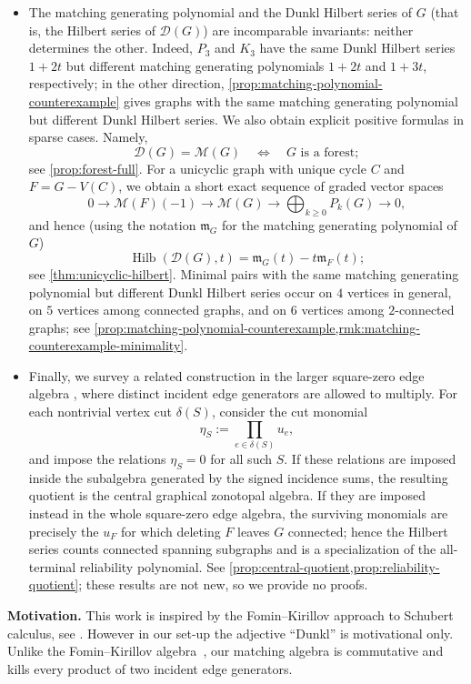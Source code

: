 \documentclass[12pt]{amsart}
\theoremstyle{definition}
\theoremstyle{remark}
\newcommand{\Hilb}{\operatorname{Hilb}}
\begin{document}
\begin{itemize}
\item
The matching generating polynomial and the Dunkl Hilbert series of $G$
(that is, the Hilbert series of $\mathcal D(G)$) are
incomparable invariants: neither determines the other.  Indeed, $P_3$ and
$K_3$ have the same Dunkl Hilbert series $1+2t$ but different matching
generating polynomials $1+2t$ and $1+3t$, respectively; in the other
direction, \cref{prop:matching-polynomial-counterexample} gives graphs with
the same matching generating polynomial but different Dunkl Hilbert series.
We also obtain explicit positive formulas in sparse cases.  Namely,
\[
  \mathcal D(G)=\mathcal M(G)
  \quad\Longleftrightarrow\quad
  G\text{ is a forest};
\]
see \cref{prop:forest-full}.  For a unicyclic graph with unique cycle $C$ and
$F=G-V(C)$, we obtain a short exact sequence of graded vector spaces
\[
 0\longrightarrow \mathcal M(F)(-1)
 \longrightarrow \mathcal M(G)
 \longrightarrow \bigoplus_{k\ge0}P_k(G)
 \longrightarrow0,
\]
and hence (using the notation $\mathfrak m_G$ for the matching
generating polynomial of $G$)
\[
 \Hilb(\mathcal D(G),t)
 =\mathfrak m_G(t)-t\mathfrak m_F(t);
\]
see \cref{thm:unicyclic-hilbert}.  Minimal pairs with the same matching generating
polynomial but different Dunkl Hilbert series occur on $4$ vertices in
general, on $5$ vertices among connected graphs, and on $6$ vertices among
$2$-connected graphs; see
\cref{prop:matching-polynomial-counterexample,rmk:matching-counterexample-minimality}.

\item
Finally, we survey a related construction in the larger square-zero edge
algebra \cite{PS}, where distinct incident edge generators are allowed to multiply.
For each nontrivial vertex cut $\delta(S)$, consider the cut monomial
\[
 \eta_S:=\prod_{e\in\delta(S)}u_e,
\]
and impose the relations $\eta_S=0$ for all such $S$.  If these relations
are imposed inside the subalgebra generated by the signed incidence sums,
the resulting quotient is the central graphical zonotopal algebra.  If they
are imposed instead in the whole square-zero edge algebra, the surviving
monomials are precisely the $u_F$ for which deleting $F$ leaves $G$
connected; hence the Hilbert series counts connected spanning subgraphs and
is a specialization of the all-terminal reliability polynomial.  See
\cref{prop:central-quotient,prop:reliability-quotient}; these results are
not new, so we provide no proofs.
\end{itemize}


\medskip
\textbf{Motivation.}
This work is inspired by the
Fomin--Kirillov approach to Schubert calculus, see \cite{FK, Bazlov, KM}.  However in our set-up the adjective ``Dunkl'' is motivational only.  Unlike the
Fomin--Kirillov algebra~\cite{FK}, our matching algebra is commutative and
kills every product of two incident edge generators. 
\end{document}
